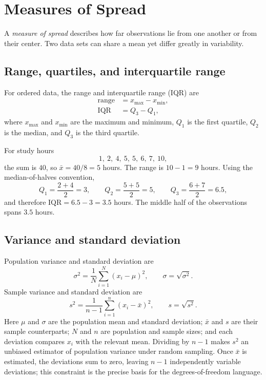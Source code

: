 \documentclass[11pt]{article}
\begin{document}
\section{Measures of Spread}\label{sec:spread}
A \emph{measure of spread} describes how far observations lie from one
another or from their center.  Two data sets can share a mean yet differ
greatly in variability.

\subsection{Range, quartiles, and interquartile range}
For ordered data, the range and interquartile range (IQR) are
\begin{align}
 \text{range}&=x_{\max}-x_{\min},\label{eq:range}\\
 \mathrm{IQR}&=Q_3-Q_1,\label{eq:iqr}
\end{align}
where $x_{\max}$ and $x_{\min}$ are the maximum and minimum, $Q_1$ is the
first quartile, $Q_2$ is the median, and $Q_3$ is the third quartile.

For study hours
\[
1,\ 2,\ 4,\ 5,\ 5,\ 6,\ 7,\ 10,
\]
the sum is $40$, so $\bar{x}=40/8=5$ hours.  The range is $10-1=9$ hours.
Using the median-of-halves convention,
\[
 Q_1=\frac{2+4}{2}=3,\qquad
 Q_2=\frac{5+5}{2}=5,\qquad
 Q_3=\frac{6+7}{2}=6.5,
\]
and therefore $\mathrm{IQR}=6.5-3=3.5$ hours.  The middle half of the
observations spans $3.5$ hours.

\subsection{Variance and standard deviation}
Population variance and standard deviation are
\begin{equation}\label{eq:pop-sd}
 \sigma^2=\frac{1}{N}\sum_{i=1}^{N}(x_i-\mu)^2,
 \qquad \sigma=\sqrt{\sigma^2}.
\end{equation}
Sample variance and standard deviation are
\begin{equation}\label{eq:samp-sd}
 s^2=\frac{1}{n-1}\sum_{i=1}^{n}(x_i-\bar{x})^2,
 \qquad s=\sqrt{s^2}.
\end{equation}
Here $\mu$ and $\sigma$ are the population mean and standard deviation;
$\bar{x}$ and $s$ are their sample counterparts; $N$ and $n$ are population
and sample sizes; and each deviation compares $x_i$ with the relevant mean.
Dividing by $n-1$ makes $s^2$ an unbiased estimator of population variance
under random sampling.  Once $\bar{x}$ is estimated, the deviations sum to
zero, leaving $n-1$ independently variable deviations; this constraint is
the precise basis for the degrees-of-freedom language.
\end{document}
